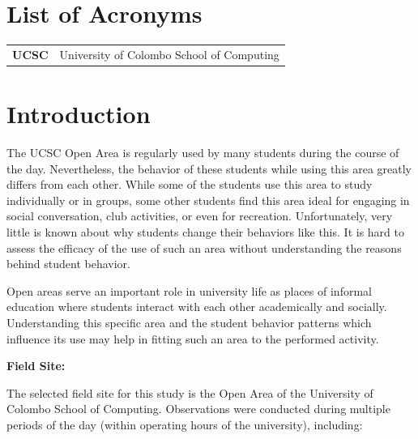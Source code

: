 \documentclass[12pt]{report}
\begin{document}
\newpage


\chapter*{List of Acronyms}

\begin{tabular}{ll}
\textbf{UCSC} & University of Colombo School of Computing \\
\end{tabular}

\newpage


\chapter{Introduction}

The UCSC Open Area is regularly used by many students during the course of the day. Nevertheless, the behavior of these students while using this area greatly differs from each other. While some of the students use this area to study individually or in groups, some other students find this area ideal for engaging in social conversation, club activities, or even for recreation. Unfortunately, very little is known about why students change their behaviors like this. It is hard to assess the efficacy of the use of such an area without understanding the reasons behind student behavior.

Open areas serve an important role in university life as places of informal education where students interact with each other academically and socially. Understanding this specific area and the student behavior patterns which influence its use may help in fitting such an area to the performed activity.

\vspace{0.5cm}
\textbf{Field Site:}

The selected field site for this study is the Open Area of the University of Colombo School of Computing. Observations were conducted during multiple periods of the day (within operating hours of the university), including:
\end{document}
